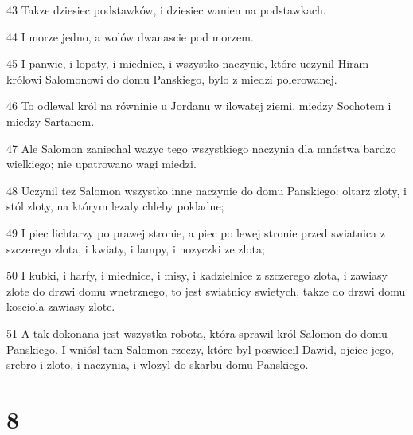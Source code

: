 \par 43 Takze dziesiec podstawków, i dziesiec wanien na podstawkach.
\par 44 I morze jedno, a wolów dwanascie pod morzem.
\par 45 I panwie, i lopaty, i miednice, i wszystko naczynie, które uczynil Hiram królowi Salomonowi do domu Panskiego, bylo z miedzi polerowanej.
\par 46 To odlewal król na równinie u Jordanu w ilowatej ziemi, miedzy Sochotem i miedzy Sartanem.
\par 47 Ale Salomon zaniechal wazyc tego wszystkiego naczynia dla mnóstwa bardzo wielkiego; nie upatrowano wagi miedzi.
\par 48 Uczynil tez Salomon wszystko inne naczynie do domu Panskiego: oltarz zloty, i stól zloty, na którym lezaly chleby pokladne;
\par 49 I piec lichtarzy po prawej stronie, a piec po lewej stronie przed swiatnica z szczerego zlota, i kwiaty, i lampy, i nozyczki ze zlota;
\par 50 I kubki, i harfy, i miednice, i misy, i kadzielnice z szczerego zlota, i zawiasy zlote do drzwi domu wnetrznego, to jest swiatnicy swietych, takze do drzwi domu kosciola zawiasy zlote.
\par 51 A tak dokonana jest wszystka robota, która sprawil król Salomon do domu Panskiego. I wniósl tam Salomon rzeczy, które byl poswiecil Dawid, ojciec jego, srebro i zloto, i naczynia, i wlozyl do skarbu domu Panskiego.

\chapter{8}


